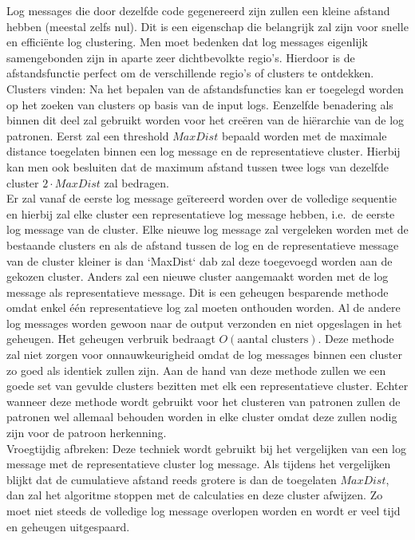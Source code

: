 \begin{itemize}
    Log messages die door dezelfde code gegenereerd zijn zullen een kleine afstand hebben (meestal zelfs nul). Dit is een eigenschap die belangrijk zal zijn voor snelle en efficiënte log clustering. Men moet bedenken dat log messages eigenlijk samengebonden zijn in aparte zeer dichtbevolkte regio's. Hierdoor is de afstandsfunctie perfect om de verschillende regio's of clusters te ontdekken.\\
    
    \subitem Clusters vinden: Na het bepalen van de afstandsfuncties kan er toegelegd worden op het zoeken van clusters op basis van de input logs. Eenzelfde benadering als binnen dit deel zal gebruikt worden voor het creëren van de hiërarchie van de log patronen. Eerst zal een threshold \(MaxDist\) bepaald worden met de maximale distance toegelaten binnen een log message en de representatieve cluster. Hierbij kan men ook besluiten dat de maximum afstand tussen twee logs van dezelfde cluster \(2 \cdot MaxDist\) zal bedragen.\\
    
    Er zal vanaf de eerste log message geïtereerd worden over de volledige sequentie en hierbij zal elke cluster een representatieve log message hebben, i.e.\ de eerste log message van de cluster. Elke nieuwe log message zal vergeleken worden met de bestaande clusters en als de afstand tussen de log en de representatieve message van de cluster kleiner is dan `MaxDist` dab zal deze toegevoegd worden aan de gekozen cluster. Anders zal een nieuwe cluster aangemaakt worden met de log message als representatieve message. Dit is een geheugen besparende methode omdat enkel één representatieve log zal moeten onthouden worden. Al de andere log messages worden gewoon naar de output verzonden en niet opgeslagen in het geheugen. Het geheugen verbruik bedraagt \(O(\text{aantal clusters})\). Deze methode zal niet zorgen voor onnauwkeurigheid omdat de log messages binnen een cluster zo goed als identiek zullen zijn. Aan de hand van deze methode zullen we een goede set van gevulde clusters bezitten met elk een representatieve cluster. Echter wanneer deze methode wordt gebruikt voor het clusteren van patronen zullen de patronen wel allemaal behouden worden in elke cluster omdat deze zullen nodig zijn voor de patroon herkenning.\\
    
    \subitem Vroegtijdig afbreken: Deze techniek wordt gebruikt bij het vergelijken van een log message met de representatieve cluster log message. Als tijdens het vergelijken blijkt dat de cumulatieve afstand reeds grotere is dan de toegelaten \(MaxDist\), dan zal het algoritme stoppen met de calculaties en deze cluster afwijzen. Zo moet niet steeds de volledige log message overlopen worden en wordt er veel tijd en geheugen uitgespaard.\\
    

\end{itemize}
